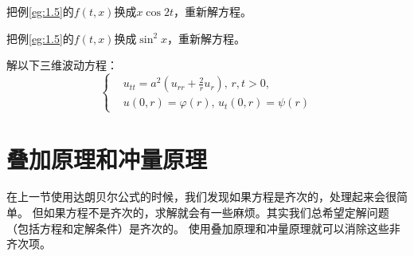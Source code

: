 \begin{problembox}
    \begin{exercise}
        把例\ref{eg:1.5}的$f(t, x)$换成$x \cos 2t$，重新解方程。
    \end{exercise}
    \begin{exercise}
        把例\ref{eg:1.5}的$f(t, x)$换成$\sin^2 x$，重新解方程。
    \end{exercise}
    \begin{exercise}
        解以下三维波动方程：
        \begin{equation*}
            \left\{
                \begin{aligned}
                    &u_{tt} = a^2 \left(u_{rr} + \frac{2}{r} u_r\right),\, r, t > 0,\\
                    &u(0, r) = \varphi(r),\, u_t(0, r) = \psi(r)
                \end{aligned}
            \right.
        \end{equation*}
    \end{exercise}
\end{problembox}
\section{叠加原理和冲量原理}
在上一节使用达朗贝尔公式的时候，我们发现如果方程是齐次的，处理起来会很简单。
但如果方程不是齐次的，求解就会有一些麻烦。其实我们总希望定解问题（包括方程和定解条件）是齐次的。
使用叠加原理和冲量原理就可以消除这些非齐次项。
